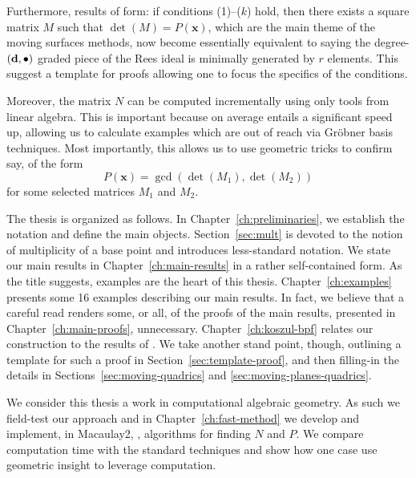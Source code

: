 \documentclass[fleqn,reqno]{amsart}
\begin{document}
Furthermore, results of form:
if conditions (1)--($k$) hold,
then there exists a square matrix $M$ such that $\det(M)=P(\mathbf x)$,
which are the main theme of the moving surfaces methods,
now become essentially equivalent to saying the degree-$(\mathbf d,\bullet)$ graded piece
of the Rees ideal is minimally generated by $r$ elements.
This suggest a template for proofs allowing one to focus the specifics of the conditions.

Moreover, the matrix $N$ can be computed incrementally
using only tools from linear algebra.
This is important because on average entails a significant speed up,
allowing us to calculate examples which are out of reach via Gr\"obner basis techniques.
Most importantly, this allows us to use geometric tricks to confirm
say, of the form
\[
	P(\mathbf x)=\gcd(\det(M_1),\det(M_2))
\]
for some selected matrices $M_1$ and $M_2$.

The thesis is organized as follows.
In Chapter~\ref{ch:preliminaries}, we establish the notation and define the main objects.
Section~\ref{sec:mult} is devoted to the notion of multiplicity of a base point and
introduces less-standard notation.
We state our main results in Chapter~\ref{ch:main-results} in a rather self-contained form.
As the title suggests, examples are the heart of this thesis.
Chapter~\ref{ch:examples} presents some 16 examples describing our main results.
In fact, we believe that a careful read renders some, or all, of the proofs of the main results,
presented in Chapter~\ref{ch:main-proofs}, unnecessary.
Chapter~\ref{ch:koszul-bpf} relates our construction to the results of \citet{CGZ-00}.
We take another stand point, though, outlining a template for such a proof in
Section~\ref{sec:template-proof},
and then filling-in the details in
Sections~\ref{sec:moving-quadrics} and \ref{sec:moving-planes-quadrics}.

We consider this thesis a work in computational algebraic geometry.
As such we field-test our approach and in Chapter~\ref{ch:fast-method}
we develop and implement, in Macaulay2, \citet{M2},
algorithms for finding $N$ and $P$.
We compare computation time with the standard techniques and
show how one case use geometric insight to leverage computation.



\end{document}
